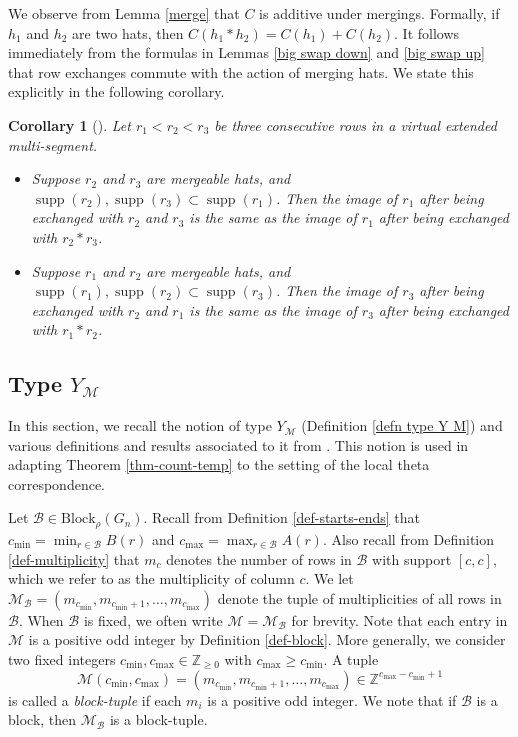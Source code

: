 \documentclass[11pt,letterpaper]{amsart}
\newcommand{\Z}{\mathbb{Z}}
\newcommand{\B}{{\mathcal B}}
\newcommand{\BB}{\mathcal{B}}
\newcommand{\Block}{\mathrm{Block}}
\newtheorem{cor}[thm]{Corollary}
\DeclareMathOperator{\supp}{supp}
\numberwithin{equation}{section}
\begin{document}
We observe from Lemma \ref{merge} that $C$ is additive under mergings. Formally, if $h_1$ and $h_2$ are two hats, then $C(h_1 * h_2) = C(h_1) + C(h_2).$ It follows immediately from the formulas in Lemmas \ref{big swap down} and \ref{big swap up} that row exchanges commute with the action of merging hats. We state this explicitly in the following corollary.

\begin{cor}[{\cite[Lemma 4.21]{HKT26}}]
\label{swap commutes with M}
    Let $r_1 < r_2 < r_3$ be three consecutive rows in a virtual extended multi-segment.
    \begin{itemize}
        \item Suppose $r_2$ and $r_3$ are mergeable hats, and  $\supp(r_2), \supp(r_3) \subset \supp(r_1)$. Then the image of $r_1$ after being exchanged with $r_2$ and $r_3$ is the same as the image of $r_1$ after being exchanged with $r_2 * r_3$.
        \item Suppose $r_1$ and $r_2$ are mergeable hats, and  $\supp(r_1), \supp(r_2) \subset \supp(r_3)$. Then the image of $r_3$ after being exchanged with $r_2$ and $r_1$ is the same as the image of $r_3$ after being exchanged with $r_1 * r_2$.
    \end{itemize}
\end{cor}


\subsection{\texorpdfstring{Type $Y_\mathcal{M}$}{}} In this section, we recall the notion of type $Y_\mathcal{M}$ (Definition \ref{defn type Y M}) and various definitions and results associated to it from \cite{HKT26}. This notion is used in adapting Theorem \ref{thm-count-temp} to the setting of the local theta correspondence.

Let $\BB\in \Block_\rho(G_n)$.
Recall from Definition \ref{def-starts-ends} that $c_{\min} = \min_{r \in \mathcal{B}} B(r)$ and $c_{\max} = \max_{r \in \mathcal{B}} A(r)$. Also recall from Definition \ref{def-multiplicity} that $m_c$ denotes the number of rows in $\mathcal{B}$ with support $[c, c]$, which we refer to as the multiplicity of column $c$. We let 
$\mathcal{M}_\B = (m_{c_{\min}}, m_{c_{\min} + 1}, \dots, m_{c_{\max}})$ denote the tuple of multiplicities of all rows in $\mathcal{B}.$ When $\B$ is fixed, we often write $\mathcal{M}=\mathcal{M}_\B$ for brevity. Note that each entry in $\mathcal{M}$ is a positive odd integer by Definition \ref{def-block}. More generally, we consider two fixed integers $c_{\min},c_{\max}\in\Z_{\geq 0}$ with $c_{\max}\geq c_{\min}$. A tuple \[\mathcal{M}(c_{\min}, c_{\max})=(m_{c_{\min}}, m_{c_{\min}+1},\dots,m_{c_{\max}})\in\Z^{c_{\max} - c_{\min} +1}\] is called a \emph{block-tuple} if each $m_{i}$ is a positive odd integer. We note that if $\B$ is a block, then $\mathcal{M}_\B$ is a block-tuple.
\end{document}
